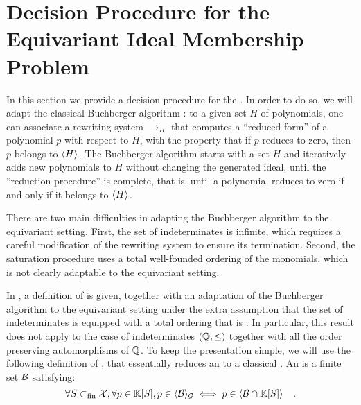 \section{Decision Procedure for the Equivariant Ideal Membership Problem}
\label{sec:algorithm}






In this section we provide a decision procedure for the . In order to do so, we will adapt the classical Buchberger
algorithm \cite{BUCH76}: to a given set $H$ of polynomials, one can associate a
rewriting system $\to_H$ that computes a ``reduced form'' of a polynomial $p$
with respect to $H$, with the property that if $p$ reduces to zero, then $p$
belongs to $\langle H\rangle_{}$. The Buchberger algorithm starts with a set $H$ and
iteratively adds new polynomials to $H$ without changing the generated ideal,
until the ``reduction procedure'' is complete, that is, until a polynomial
reduces to zero if and only if it belongs to $\langle H\rangle_{}$.

There are two main difficulties in adapting the Buchberger algorithm to the
equivariant setting. First, the set of indeterminates is infinite, which
requires a careful modification of the rewriting system to ensure its
termination. Second, the saturation procedure uses a total well-founded
ordering of the monomials, which is not clearly adaptable to the equivariant
setting.

In \cite{GHOLAS24}, a definition of  is given,
together with an adaptation of the Buchberger algorithm to the equivariant
setting under the extra assumption that the set of indeterminates is equipped
with a  total ordering that is . In particular, this result does not apply to the case of
indeterminates $(\mathbb{Q}, \leq)$ together with all the order preserving
automorphisms of $\mathbb{Q}$.
To keep the presentation simple, we will use the following definition
of , that essentially
reduces an  to a classical
.
An  
is a finite set $\Basis$
satisfying:
\begin{equation}
    \label{eq:grob-eq-bas}
    \forall S \subfin \X, 
    \forall p \in \poly{\K}{S},
    p \in \gen{\Basis}{\group}
    \iff
    p \in \gen{\Basis \cap \poly{\K}{S}}
        \quad .
\end{equation}

